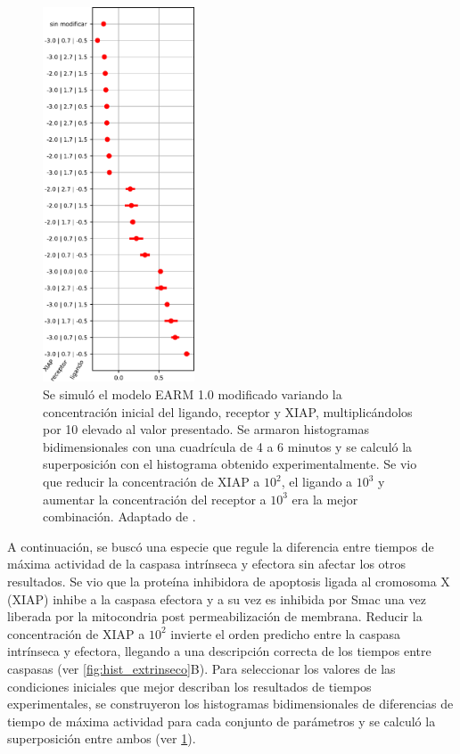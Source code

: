 \begin{figure}[t!]
    \centering
    \includegraphics[width=0.4\textwidth]{img/cap_4/supplementary_4_A.pdf}
    \caption{\footnotesize{Se simuló el modelo EARM 1.0 modificado variando la concentración inicial del ligando, receptor y XIAP, multiplicándolos por 10 elevado al valor presentado. Se armaron histogramas bidimensionales con una cuadrícula de 4 a 6 minutos y se calculó la superposición con el histograma obtenido experimentalmente. Se vio que reducir la concentración de XIAP a $10^2$, el ligando a $10^3$ y aumentar la concentración del receptor a $10^3$ era la mejor combinación. Adaptado de \cite{Corbat2018}.}}
    \label{fig:cuad_min}
\end{figure}

A continuación, se buscó una especie que regule la diferencia entre tiempos de máxima actividad de la caspasa intrínseca y efectora sin afectar los otros resultados. Se vio que la proteína inhibidora de apoptosis ligada al cromosoma X (XIAP) inhibe a la caspasa efectora y a su vez es inhibida por Smac una vez liberada por la mitocondria post permeabilización de membrana. Reducir la concentración de XIAP a $10^2$ invierte el orden predicho entre la caspasa intrínseca y efectora, llegando a una descripción correcta de los tiempos entre caspasas (ver \cref{fig:hist_extrinseco}B). Para seleccionar los valores de las condiciones iniciales que mejor describan los resultados de tiempos experimentales, se construyeron los histogramas bidimensionales de diferencias de tiempo de máxima actividad para cada conjunto de parámetros y se calculó la superposición entre ambos (ver \cref{fig:cuad_min}).

